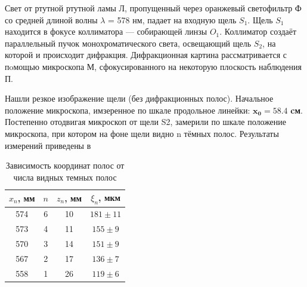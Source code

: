 \indent
Свет от ртутной ртутной ламы Л, пропущенный через оранжевый светофильтр Ф со средней
длиной волны $\lambda$ = 578 нм, падает на входную щель $S_1$. Щель $S_1$ находится в фокусе
коллиматора — собирающей линзы $O_1$. Коллиматор создаёт параллельный пучок монохроматического света, освещающий щель $S_2$, на которой и происходит дифракция. Дифракционная картина рассматривается с пoмощью микроскопа М, сфокусированного на некоторую плоскость наблюдения П.

\indent
Нашли резкое изображение щели (без дифракционных полос). Начальное положение микроскопа, имзеренное по шкале продольное линейки: $\mathbf{x_0 = 58.4}$ \textbf{cм}.\\\indent
Постепенно отодвигая микроскоп от щели S2, замерили по шкале положение микроскопа, при котором на фоне щели видно n  тёмных
полос. Результаты измерений приведены в
\begin{table}[h]
    \centering
    \begin{tabular}{|c|c|c|c|}
        \hline
        \( x_n \), мм & \( n \) & \( z_n\), мм & \( \xi_n \), мкм \\\hline
        574    & 6    & 10    & $181 \pm 11$   \\ \hline
        573    & 4    & 11    & $155 \pm 9 $   \\ \hline
        570    & 3    & 14    & $151 \pm 9 $   \\ \hline
        567    & 2    & 17    & $136 \pm 7 $   \\ \hline
        558    & 1    & 26    & $119 \pm 6 $   \\ \hline
    \end{tabular}
    \caption{Зависимость координат полос от числа видных темных полос} \label{table:measurements_A}
\end{table}

